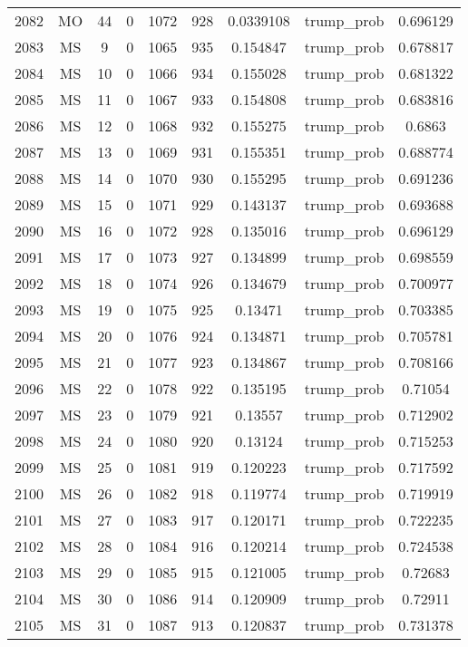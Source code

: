 \documentclass[12pt,a4paper]{article}
\begin{document}
\begin{tabular}{r|cccccccc}
	2082 & MO & 44 & 0 & 1072 & 928 & 0.0339108 & trump\_prob & 0.696129 \\
	2083 & MS & 9 & 0 & 1065 & 935 & 0.154847 & trump\_prob & 0.678817 \\
	2084 & MS & 10 & 0 & 1066 & 934 & 0.155028 & trump\_prob & 0.681322 \\
	2085 & MS & 11 & 0 & 1067 & 933 & 0.154808 & trump\_prob & 0.683816 \\
	2086 & MS & 12 & 0 & 1068 & 932 & 0.155275 & trump\_prob & 0.6863 \\
	2087 & MS & 13 & 0 & 1069 & 931 & 0.155351 & trump\_prob & 0.688774 \\
	2088 & MS & 14 & 0 & 1070 & 930 & 0.155295 & trump\_prob & 0.691236 \\
	2089 & MS & 15 & 0 & 1071 & 929 & 0.143137 & trump\_prob & 0.693688 \\
	2090 & MS & 16 & 0 & 1072 & 928 & 0.135016 & trump\_prob & 0.696129 \\
	2091 & MS & 17 & 0 & 1073 & 927 & 0.134899 & trump\_prob & 0.698559 \\
	2092 & MS & 18 & 0 & 1074 & 926 & 0.134679 & trump\_prob & 0.700977 \\
	2093 & MS & 19 & 0 & 1075 & 925 & 0.13471 & trump\_prob & 0.703385 \\
	2094 & MS & 20 & 0 & 1076 & 924 & 0.134871 & trump\_prob & 0.705781 \\
	2095 & MS & 21 & 0 & 1077 & 923 & 0.134867 & trump\_prob & 0.708166 \\
	2096 & MS & 22 & 0 & 1078 & 922 & 0.135195 & trump\_prob & 0.71054 \\
	2097 & MS & 23 & 0 & 1079 & 921 & 0.13557 & trump\_prob & 0.712902 \\
	2098 & MS & 24 & 0 & 1080 & 920 & 0.13124 & trump\_prob & 0.715253 \\
	2099 & MS & 25 & 0 & 1081 & 919 & 0.120223 & trump\_prob & 0.717592 \\
	2100 & MS & 26 & 0 & 1082 & 918 & 0.119774 & trump\_prob & 0.719919 \\
	2101 & MS & 27 & 0 & 1083 & 917 & 0.120171 & trump\_prob & 0.722235 \\
	2102 & MS & 28 & 0 & 1084 & 916 & 0.120214 & trump\_prob & 0.724538 \\
	2103 & MS & 29 & 0 & 1085 & 915 & 0.121005 & trump\_prob & 0.72683 \\
	2104 & MS & 30 & 0 & 1086 & 914 & 0.120909 & trump\_prob & 0.72911 \\
	2105 & MS & 31 & 0 & 1087 & 913 & 0.120837 & trump\_prob & 0.731378 \\

\end{tabular}
\end{document}

